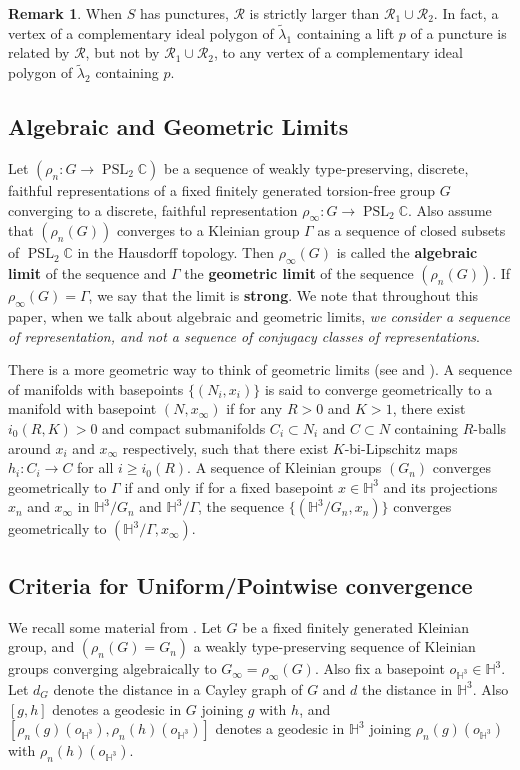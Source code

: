 \documentclass{amsart}
\theoremstyle{definition}
\newtheorem{rmk}[theorem]{Remark}
\newcommand{\complexes}{\mathbb{C}}
\newcommand{\pslc}{\operatorname{PSL}_2\complexes}
\newcommand\HHH{{\mathbb H}}
\newcommand\RR{{\mathcal R}}
\newcommand\Hyp{{\mathbb H}}
\begin{document}
\begin{rmk}
When $S$ has punctures, $\RR$ is strictly larger than $\RR_1 \cup \RR_2$.
In fact, a vertex of a complementary ideal polygon of $\tilde \lambda_1$ containing a lift $p$ of a puncture is related by $\RR$, but not by $\RR_1 \cup \RR_2$, to any vertex of a complementary ideal polygon of $\tilde \lambda_2$ containing $p$.
\end{rmk}

\subsection{Algebraic and Geometric Limits}

Let $(\rho_n : G \rightarrow \pslc)$ be a sequence of weakly type-preserving, discrete, faithful
representations of a fixed finitely generated torsion-free
group $G$
converging to a discrete, faithful representation $\rho_\infty \colon G \rightarrow \pslc$. Also
assume that $( \rho_n(G))$ converges 
to a  Kleinian group
$\Gamma$ as a sequence of closed subsets of $\pslc$ in the Hausdorff topology. Then $\rho_\infty(G )$ is called the 
{\bf algebraic limit} of the sequence and $\Gamma$
the {\bf geometric limit} of the sequence $(\rho_n(G))$.
If $\rho_\infty(G)=\Gamma$, we say that the limit is {\bf strong}.
We note that throughout this paper, when we talk about algebraic and geometric limits, {\em we consider a sequence of representation, and not a sequence of conjugacy classes of representations}.

	

There is a more geometric way to think  of geometric limits (see \cite{thurstonnotes} and \cite{CEG}). 
A sequence of manifolds
	with basepoints $\{(N_i, x_i )\}$ is said to converge  geometrically 
	to a manifold with basepoint $(N, x_\infty)$ if for any $R>0$ and $K>1$, there exist $i_0(R,K)>0$ and compact submanifolds $C_i\subset N_i$ and $C\subset N$ containing  $R$-balls around $x_i$ and $x_\infty$ respectively, such that there exist  $K$-bi-Lipschitz maps 
	$h_i\colon C_i \to C$  for all $i \geq i_0(R)$.
A sequence of Kleinian groups $(G_n)$ converges geometrically to $\Gamma$ if and only if for a fixed basepoint $x \in \HHH^3$ and its projections $x_n$ and $x_\infty$ in $\HHH^3/G_n$ and $\HHH^3/\Gamma$, the sequence $\{(\HHH^3/G_n, x_n)\}$ converges geometrically to $(\HHH^3/\Gamma, x_\infty)$.
\medskip




\subsection{Criteria for Uniform/Pointwise convergence}
We recall some material from \cite{mahan-series1, mahan-series2}.
  Let $G$ be a fixed finitely generated
	Kleinian group, and $(\rho_n (G) = G_n)$  a weakly type-preserving sequence
	of  Kleinian groups converging algebraically to  $ 
	G_\infty = \rho_\infty (G)$.  Also fix a basepoint $o_{\HHH^3} \in \Hyp^3$. Let $d_G$ denote
	the distance in a Cayley graph of $G$ and $d$ 
	the distance in $\Hyp^3$. Also $[g,h]$ denotes a geodesic in $G$ joining $g$ with $h$, and 
	$[\rho_n(g) (o_{\HHH^3}), \rho_n(h) (o_{\HHH^3})]$ denotes a geodesic in $\HHH^3$ joining  $\rho_n(g) (o_{\HHH^3})$ with $\rho_n(h) (o_{\HHH^3})$.
	
\end{document}
